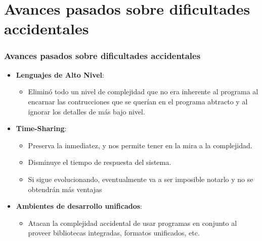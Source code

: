 \documentclass{beamer}
\begin{document}
\section{Avances pasados sobre dificultades accidentales}
\begin{frame}
\frametitle{Avances pasados sobre dificultades accidentales}
\begin{itemize}
	\item \textbf{Lenguajes de Alto Nivel}:
			\begin{itemize}
				\item Eliminó todo un nivel de complejidad que no era inherente al programa al encarnar las contrucciones que se querían en el programa abtracto y al ignorar los detalles de más bajo nivel.
			\end{itemize}
	\item \textbf{Time-Sharing}:
			\begin{itemize}
				\item Preserva la inmediatez, y nos permite tener en la mira a la complejidad.
				\item Disminuye el tiempo de respuesta del sistema.
				\item Si sigue evolucionando, eventualmente va a ser imposible notarlo y no se obtendrán más ventajas
			\end{itemize}
	\item \textbf{Ambientes de desarrollo unificados}:
			\begin{itemize}
				\item Atacan la complejidad accidental de usar programas en conjunto al proveer bibliotecas integradas, formatos unificados, etc.
			\end{itemize}
	  
\end{itemize}

\end{frame}
\end{document}
